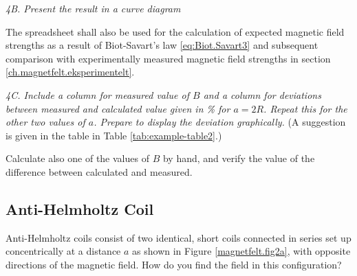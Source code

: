 \documentclass[../Elmag-labhefte-2020.tex]{subfiles}
\begin{document}
\emph{ 4B. Present the result in a curve diagram}

The spreadsheet shall also be used for the calculation of expected magnetic field strengths as a result of Biot-Savart's law \eqref{eq:Biot.Savart3} and subsequent comparison with experimentally measured magnetic field strengths in section \ref{ch.magnetfelt.eksperimentelt}.

\emph{ 4C. Include a column for measured value of $B$ and a column for deviations between measured and calculated value given in \si{\percent} for $a = 2R$. Repeat this for the other two values   of $a$. Prepare to display the deviation graphically.} (A suggestion is given in the table in Table \ref{tab:example-table2}.)

Calculate also one of the values of $B$ by hand, and verify the value of the difference between calculated and measured.

\subsection{Anti-Helmholtz Coil}
Anti-Helmholtz coils consist of two identical, short coils connected in series set up concentrically at a distance $a$ as shown in Figure \ref{magnetfelt.fig2a}, with opposite directions of the magnetic field. How do you find the field in this configuration?
\end{document}
